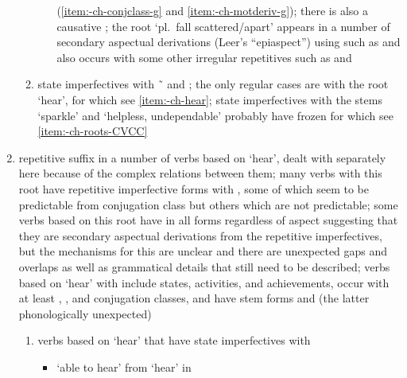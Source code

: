 \begin{morphdesc}[resume*=alphalist]
\begin{enumerate}
\begin{enumerate}
\begin{itemize}
				(\ref{item:-ch-conjclass-g̱} and \ref{item:-ch-motderiv-g̱});
				there is also a causative 
				\parencite[823]{leer:1976};
				the root  ‘pl.\ fall scattered/apart’
				appears in a number of secondary aspectual derivations 
				(Leer’s “epiaspect”) using  such as
				and also occurs with some other irregular repetitives such as
				and 
				\parencite[all][823]{leer:1976}
			\end{itemize}
		\item	\label{item:-ch-oddrep-state}
			state imperfectives with  \~\  and ;
			the only regular cases are with the root  ‘hear’,
				for which see \ref{item:-ch-hear};
			state imperfectives with the stems  ‘sparkle’
				and  ‘helpless, undependable’
				probably have frozen 
				for which see \ref{item:-ch-roots-CVCC}
		\end{enumerate}
	\item	\label{item:-ch-hear}
		repetitive suffix in a number of verbs based on  ‘hear’,
			dealt with separately here because of the complex relations between them;
		many verbs with this root have repetitive imperfective forms with ,
			some of which seem to be predictable from conjugation class
			but others which are not predictable;
		some verbs based on this root have  in all forms regardless of aspect
			suggesting that they are secondary aspectual derivations from the
			repetitive imperfectives, but the mechanisms for this are unclear
			and there are unexpected gaps and overlaps
			as well as grammatical details that still need to be described;
		verbs based on  ‘hear’ with  include states,
			activities, and achievements,
			occur with at least , , and  conjugation classes,
			and have stem forms  and 
			(the latter phonologically unexpected)
		\begin{enumerate}
		\item	verbs based on  ‘hear’
			that have state imperfectives with 
			\begin{itemize}
			\item	{} ‘able to hear’
				from  ‘hear’ in
				\newline

\end{itemize}
\end{enumerate}
\end{enumerate}
\end{morphdesc}
